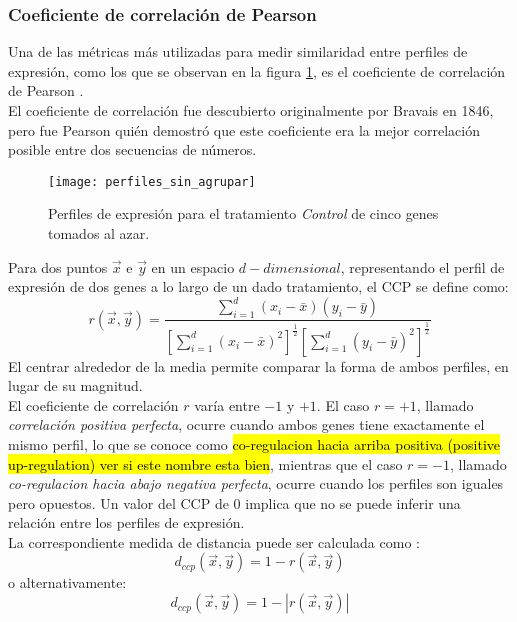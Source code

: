 \subsubsection{Coeficiente de correlación de Pearson}
Una de las métricas más utilizadas para medir similaridad entre perfiles de expresión, como los que se observan en la figura \ref{fig:perfiles_sin_agrupar}, es el coeficiente de correlación de Pearson \cite{Babu2004}.\\
El coeficiente de correlación fue descubierto originalmente por Bravais en 1846, pero fue Pearson quién demostró que este coeficiente era la mejor correlación posible entre dos secuencias de números\cite{Kheng2010}.\\
\begin{figure}[h]
    \centering
    \texttt{[image: perfiles\_sin\_agrupar]}
    \caption{Perfiles de expresión para el tratamiento \textit{Control} de cinco genes tomados al azar.}
    \label{fig:perfiles_sin_agrupar}
\end{figure}
Para dos puntos $\vec{x}$ e $\vec{y}$ en un espacio $d-dimensional$, representando el perfil de expresión de dos genes a lo largo de un dado tratamiento, el CCP se define como:
\begin{equation}
	r(\vec{x}, \vec{y}) = \frac{\sum\limits_{i=1}^d(x_i-\bar{x})(y_i-\bar{y})}{[\sum\limits_{i=1}^d(x_i-\bar{x})^2]^\frac{1}{2}[\sum\limits_{i=1}^d(y_i-\bar{y})^2]^\frac{1}{2}}
\end{equation}
El centrar alrededor de la media permite comparar la forma de ambos perfiles, en lugar de su magnitud.\\
El coeficiente de correlación $r$ varía entre $-1$ y $+1$. El caso $r = +1$, llamado \textit{correlación positiva perfecta}, ocurre cuando ambos genes tiene exactamente el mismo perfil, lo que se conoce como \hl{co-regulacion hacia arriba positiva (positive up-regulation) ver si este nombre esta bien}, mientras que el caso $r=-1$, llamado \textit{co-regulacion hacia abajo negativa perfecta}, ocurre cuando los perfiles son iguales pero opuestos. Un valor del CCP de $0$ implica que no se puede inferir una relación entre los perfiles de expresión.\\
La correspondiente medida de distancia puede ser calculada como \cite{Dhaeseleer2005}:
\begin{equation}
	d_{ccp}(\vec{x}, \vec{y}) = 1-r(\vec{x}, \vec{y})
	\label{eq:distancia_correlacion}
\end{equation}
o alternativamente:
\begin{equation}
	d_{ccp}(\vec{x}, \vec{y}) = 1-|r(\vec{x}, \vec{y})|
	\label{eq:distancia_correlacion_absoluta}
\end{equation}
